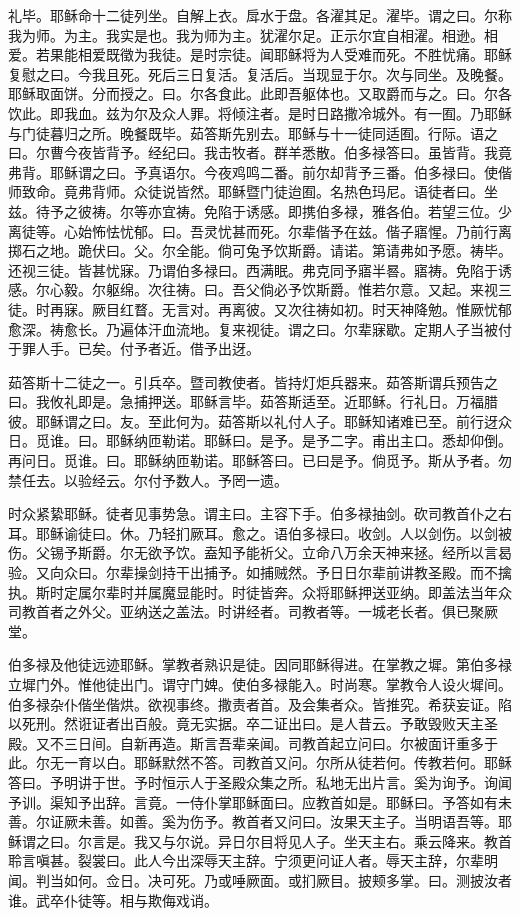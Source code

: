 \documentclass[UTF8,17pt]{ctexart}
\begin{document}
礼毕。耶稣命⼗⼆徒列坐。⾃解上⾐。戽⽔于盘。各濯其⾜。濯毕。谓之曰。尔称我为师。为主。我实是也。我为师为主。犹濯尔⾜。正⽰尔宜⾃相濯。相逊。相爱。若果能相爱既徵为我徒。是时宗徒。闻耶稣将为⼈受难⽽死。不胜忧痛。耶稣复慰之曰。今我且死。死后三⽇复活。复活后。当现显于尔。次与同坐。及晚餐。耶稣取⾯饼。分⽽授之。曰。尔各⾷此。此即吾躯体也。又取爵⽽与之。曰。尔各饮此。即我⾎。兹为尔及众⼈罪。将倾注者。是时⽇路撒冷城外。有⼀囿。乃耶稣与门徒暮归之所。晚餐既毕。茹答斯先别去。耶稣与⼗⼀徒同适囿。⾏际。语之曰。尔曹今夜皆背予。经纪曰。我击牧者。群⽺悉散。伯多禄答⽈。虽皆背。我竟弗背。耶稣谓之⽈。予真语尔。今夜鸡鸣⼆番。前尔却背予三番。伯多禄⽈。使偕师致命。竟弗背师。众徒说皆然。耶稣暨门徒迨囿。名热⾊玛尼。语徒者曰。坐兹。待予之彼祷。尔等亦宜祷。免陷于诱感。即携伯多禄，雅各伯。若望三位。少离徒等。⼼始怖怯忧郁。曰。吾灵忧甚⽽死。尔辈偕予在兹。偕⼦寤惺。乃前⾏离掷⽯之地。跪伏⽈。⽗。尔全能。倘可兔予饮斯爵。请诺。第请弗如予愿。祷毕。还视三徒。皆甚忧寐。乃谓伯多禄曰。西满眠。弗克同予寤半晷。寤祷。免陷于诱感。尔⼼毅。尔躯绵。次往祷。曰。吾⽗倘必予饮斯爵。惟若尔意。又起。来视三徒。时再寐。厥⽬红瞀。⽆⾔对。再离彼。又次往祷如初。时天神降勉。惟厥忧郁愈深。祷愈长。乃遍体汗⾎流地。复来视徒。谓之⽈。尔辈寐歇。定期⼈⼦当被付于罪⼈⼿。已矣。付予者近。借予出迓。

茹答斯⼗⼆徒之⼀。引兵卒。暨司教使者。皆持灯炬兵器来。茹答斯谓兵预告之⽈。我攸礼即是。急捕押送。耶稣⾔毕。茹答斯适⾄。近耶稣。⾏礼⽇。万福腊彼。耶稣谓之曰。友。⾄此何为。茹答斯以礼付⼈⼦。耶稣知诸难已⾄。前⾏迓众⽇。觅谁。曰。耶稣纳匝勒诺。耶稣⽈。是予。是予⼆字。甫出主口。悉却仰倒。再问⽇。觅谁。曰。耶稣纳匝勒诺。耶稣答⽈。已曰是予。倘觅予。斯从予者。勿禁任去。以验经云。尔付予数⼈。予罔⼀遗。

时众紧絷耶稣。徒者见事势急。谓主曰。主容下⼿。伯多禄抽剑。砍司教⾸仆之右⽿。耶稣谕徒曰。休。乃轻扪厥⽿。愈之。语伯多禄⽈。收剑。⼈以剑伤。以剑被伤。⽗锡予斯爵。尔⽆欲予饮。盍知予能祈⽗。⽴命⼋万余天神来拯。经所以⾔曷验。又向众曰。尔辈操剑持⼲出捕予。如捕贼然。予⽇⽇尔辈前讲教圣殿。⽽不擒执。斯时定属尔辈时并属魔显能时。时徒皆奔。众将耶稣押送亚纳。即盖法当年众司教⾸者之外⽗。亚纳送之盖法。时讲经者。司教者等。⼀城⽼长者。俱已聚厥堂。

伯多禄及他徒远迹耶稣。掌教者熟识是徒。因同耶稣得进。在掌教之墀。第伯多禄⽴墀门外。惟他徒出门。谓守门婢。使伯多禄能⼊。时尚寒。掌教令⼈设⽕墀间。伯多禄杂仆偕坐偕烘。欲视事终。撒责者⾸。及会集者众。皆推究。希获妄证。陷以死刑。然诳证者出百般。竟⽆实据。卒⼆证出曰。是⼈昔云。予敢毁败天主圣殿。又不三⽇间。⾃新再造。斯⾔吾辈亲闻。司教⾸起⽴问曰。尔被⾯讦重多于此。尔⽆⼀育以⽩。耶稣默然不答。司教⾸又问。尔所从徒若何。传教若何。耶稣答曰。予明讲于世。予时恒⽰⼈于圣殿众集之所。私地⽆出⽚⾔。奚为询予。询闻予训。渠知予出辞。⾔竟。⼀侍仆掌耶稣⾯曰。应教⾸如是。耶稣曰。予答如有未善。尔证厥未善。如善。奚为伤予。教⾸者又问曰。汝果天主⼦。当明语吾等。耶稣谓之曰。尔⾔是。我又与尔说。异⽇尔⽬将见⼈⼦。坐天主右。乘云降来。教⾸聆⾔嗔甚。裂裳曰。此⼈今出深辱天主辞。宁须更问证⼈者。辱天主辞，尔辈明闻。判当如何。佥⽇。决可死。乃或唾厥⾯。或扪厥⽬。披颊多掌。曰。测披汝者谁。武卒仆徒等。相与欺侮戏诮。
\end{document}
